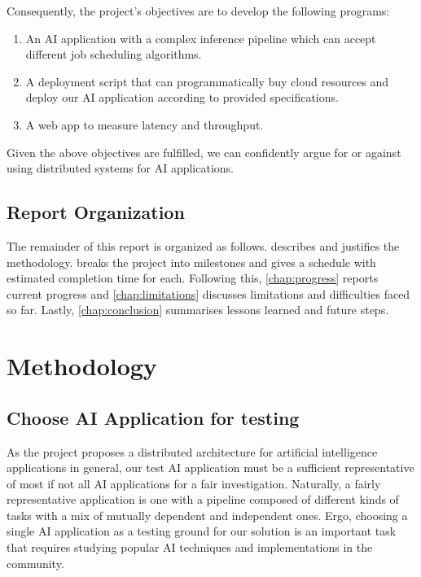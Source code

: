 \documentclass{report}
\begin{document}
Consequently, the project's objectives are to develop the following programs:
\begin{enumerate}
  \item An AI application with a complex inference pipeline which can accept different job scheduling algorithms.
  \item A deployment script that can programmatically buy cloud resources and deploy our AI application according to provided specifications.
  \item A web app to measure latency and throughput.
\end{enumerate}

Given the above objectives are fulfilled, we can confidently argue for or against using distributed systems for AI applications.

\section{Report Organization}
The remainder of this report is organized as follows.  describes and justifies the methodology.  breaks the project into milestones and gives a schedule with estimated completion time for each. Following this, \cref{chap:progress} reports current progress and \cref{chap:limitations} discusses limitations and difficulties faced so far. Lastly, \cref{chap:conclusion} summarises lessons learned and future steps.

\chapter{Methodology}\label{chap:methodology}

\section{Choose AI Application for testing}
As the project proposes a distributed architecture for artificial intelligence applications in general, our test AI application must be a sufficient representative of most if not all AI applications for a fair investigation. Naturally, a fairly representative application is one with a pipeline composed of different kinds of tasks with a mix of mutually dependent and independent ones. Ergo, choosing a single AI application as a testing ground for our solution is an important task that requires studying popular AI techniques and implementations in the community.
\end{document}
